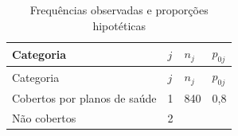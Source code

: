\documentclass[]{book}
\theoremstyle{definition}
\theoremstyle{definition}
\theoremstyle{definition}
\theoremstyle{remark}
\begin{document}
\begin{longtable}[]{@{}llll@{}}
\caption{\label{tab:prophip} Frequências observadas e proporções
hipotéticas}\tabularnewline
\toprule
\begin{minipage}[b]{0.23\columnwidth}\raggedright\strut
Categoria\strut
\end{minipage} & \begin{minipage}[b]{0.05\columnwidth}\raggedright\strut
\(j\)\strut
\end{minipage} & \begin{minipage}[b]{0.07\columnwidth}\raggedright\strut
\(n_j\)\strut
\end{minipage} & \begin{minipage}[b]{0.11\columnwidth}\raggedright\strut
\(p_{0j}\)\strut
\end{minipage}\tabularnewline
\midrule
\endfirsthead
\toprule
\begin{minipage}[b]{0.23\columnwidth}\raggedright\strut
Categoria\strut
\end{minipage} & \begin{minipage}[b]{0.05\columnwidth}\raggedright\strut
\(j\)\strut
\end{minipage} & \begin{minipage}[b]{0.07\columnwidth}\raggedright\strut
\(n_j\)\strut
\end{minipage} & \begin{minipage}[b]{0.11\columnwidth}\raggedright\strut
\(p_{0j}\)\strut
\end{minipage}\tabularnewline
\midrule
\endhead
\begin{minipage}[t]{0.23\columnwidth}\raggedright\strut
Cobertos por planos de saúde\strut
\end{minipage} & \begin{minipage}[t]{0.05\columnwidth}\raggedright\strut
1\strut
\end{minipage} & \begin{minipage}[t]{0.07\columnwidth}\raggedright\strut
840\strut
\end{minipage} & \begin{minipage}[t]{0.11\columnwidth}\raggedright\strut
0,8\strut
\end{minipage}\tabularnewline
\begin{minipage}[t]{0.23\columnwidth}\raggedright\strut
Não cobertos\strut
\end{minipage} & \begin{minipage}[t]{0.05\columnwidth}\raggedright\strut
2\strut
\end{minipage} & \begin{minipage}[t]{0.07\columnwidth}\raggedright\strut

\end{minipage}
\end{longtable}
\end{document}

